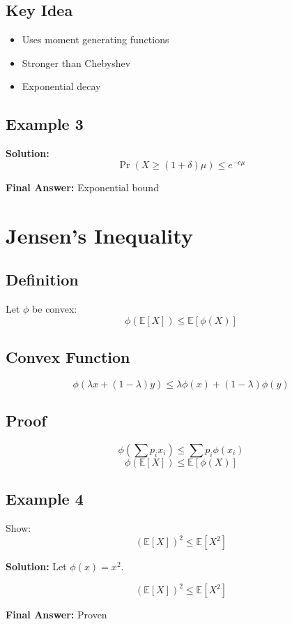 \documentclass[11pt]{article}
\begin{document}
\subsection*{Key Idea}
\begin{itemize}
\item Uses moment generating functions
\item Stronger than Chebyshev
\item Exponential decay
\end{itemize}

\subsection*{Example 3}
\textbf{Solution:}
\[
\Pr(X \geq (1+\delta)\mu) \leq e^{-c\mu}
\]

\textbf{Final Answer:} Exponential bound

\section{Jensen’s Inequality}

\subsection*{Definition}
Let $\phi$ be convex:
\[
\phi(\mathbb{E}[X]) \leq \mathbb{E}[\phi(X)]
\]

\subsection*{Convex Function}
\[
\phi(\lambda x + (1-\lambda)y) \leq \lambda \phi(x) + (1-\lambda)\phi(y)
\]

\subsection*{Proof}
\[
\phi\left(\sum p_i x_i\right) \leq \sum p_i \phi(x_i)
\]
\[
\phi(\mathbb{E}[X]) \leq \mathbb{E}[\phi(X)]
\]

\subsection*{Example 4}
Show:
\[
(\mathbb{E}[X])^2 \leq \mathbb{E}[X^2]
\]

\textbf{Solution:}
Let $\phi(x) = x^2$.

\[
(\mathbb{E}[X])^2 \leq \mathbb{E}[X^2]
\]

\textbf{Final Answer:} Proven
\end{document}
